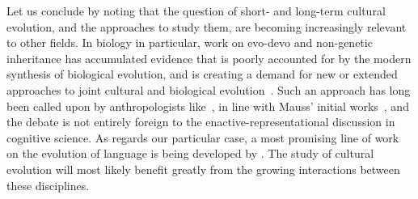 \begin{new}

Let us conclude by noting that the question of short- and long-term cultural evolution, and the approaches to study them, are becoming increasingly relevant to other fields.
In biology in particular, work on evo-devo and non-genetic inheritance has accumulated evidence that is poorly accounted for by the modern synthesis of biological evolution, and is creating a demand for new or extended  approaches to joint cultural and biological evolution~\citep[see][for instance]{gilbert_eco-evo-devo:_2015}.
Such an approach has long been called upon by anthropologists like~\citet{ingold_beyond_2004,ingold_three_1999}, in line with Mauss' initial works~\citep{mauss_les_1936}, and the debate is not entirely foreign to the enactive-representational discussion in cognitive science.
As regards our particular case, a most promising line of work on the evolution of language is being developed by \citet{cuffari_participatory_2014}.
The study of cultural evolution will most likely benefit greatly from the growing interactions between these disciplines.

\end{new}